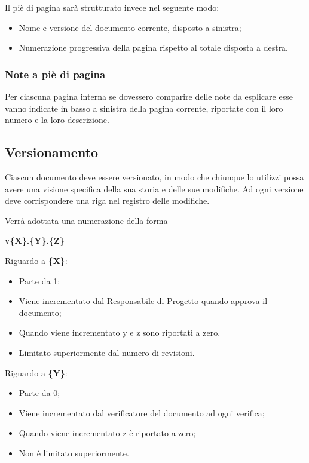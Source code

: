 	Il piè di pagina sarà strutturato invece nel seguente modo:
	
	\begin{itemize}
	
		\item Nome e versione del documento corrente, disposto a sinistra;
		\item Numerazione progressiva della pagina rispetto al totale disposta a destra.
	
	\end{itemize}
	
	\subsubsection{Note a piè di pagina}
	
	Per ciascuna pagina interna se dovessero comparire delle note da esplicare esse vanno indicate in basso a sinistra della pagina corrente, riportate con il loro numero e la loro descrizione.

\subsection{Versionamento}

Ciascun documento deve essere versionato, in modo che chiunque lo utilizzi possa avere una visione specifica della sua storia e delle sue modifiche. Ad ogni versione deve corrispondere una riga nel registro delle modifiche.

Verrà adottata una numerazione della forma
\begin{center}
 \textbf{v\{X\}.\{Y\}.\{Z\}}
\end{center}

Riguardo a \textbf{\{X\}}:
\begin{itemize}
 \item Parte da 1;
 \item Viene incrementato dal Responsabile di Progetto quando approva il documento;
 \item Quando viene incrementato y e z sono riportati a zero.
 \item Limitato superiormente dal numero di revisioni.
\end{itemize}

Riguardo a \textbf{\{Y\}}:
\begin{itemize}
 \item Parte da 0;
 \item Viene incrementato dal verificatore del documento ad ogni verifica;
 \item Quando viene incrementato z è riportato a zero;
 \item Non è limitato superiormente.
\end{itemize}

